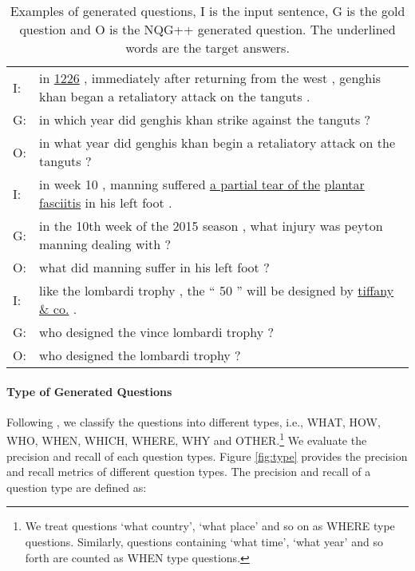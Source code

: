 \documentclass[11pt,letterpaper]{article}
\newcommand{\ourModelName}{NQG}
\begin{document}
\begin{table}[htbp]
	\small
	\begin{center}
		\begin{tabular}{|lp{}|}
			\hline
			I: & in \underline{1226} , immediately after returning from the west , genghis khan began a retaliatory attack on the tanguts .\\
			G: & in which year did genghis khan strike against the tanguts ?\\
			O: & in what year did genghis khan begin a retaliatory attack on the tanguts ?\\
			\hline
			I: & in week 10 , manning suffered \underline{a partial tear of the} \underline{plantar fasciitis} in his left foot .\\
			G: & in the 10th week of the 2015 season , what injury was peyton manning dealing with ?\\
			O: & what did manning suffer in his left foot ?\\
			\hline
			I: & like the lombardi trophy , the `` 50 '' will be designed by \underline{tiffany \& co.} .\\
			G: & who designed the vince lombardi trophy ?\\
			O: & who designed the lombardi trophy ?\\
			\hline
		\end{tabular}
	\end{center}
	\caption{\label{tbl:example}Examples of generated questions, I is the input sentence, G is the gold question and O is the \ourModelName{}++ generated question. The underlined words are the target answers.}
\end{table}

\paragraph{Type of Generated Questions}
Following \citet{wang2016machine}, we classify the questions into different types, i.e., WHAT, HOW, WHO, WHEN, WHICH, WHERE, WHY and OTHER.\footnote{We treat questions `what country', `what place' and so on as WHERE type questions. Similarly, questions containing `what time', `what year' and so forth are counted as WHEN type questions.}
We evaluate the precision and recall of each question types.
Figure \ref{fig:type} provides the precision and recall metrics of different question types.
The precision and recall of a question type  are defined as:
\end{document}
